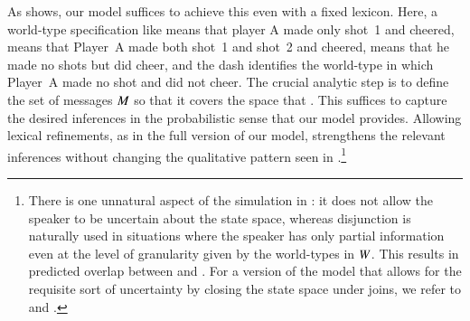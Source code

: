\documentclass[leqno,12pt]{article}
\begin{document}
As  shows, our model suffices to achieve this
even with a fixed lexicon. Here, a world-type specification like
 means that player A made only shot~1 and cheered,
 means that Player~A made both shot~1 and
shot~2 and cheered,  means that he made no shots but did
cheer, and the dash identifies the world-type in which Player~A made
no shot and did not cheer. The crucial analytic step is to define the
set of messages $M$ so that it covers the space that
\citeauthor{Sauerland01}. This suffices to capture the desired
inferences in the probabilistic sense that our model provides.
Allowing lexical refinements, as in the full version of our model,
strengthens the relevant inferences without changing the qualitative
pattern seen in .\footnote{There is one
  unnatural aspect of the simulation in : it
  does not allow the speaker to be uncertain about the state space,
  whereas disjunction is naturally used in situations where the
  speaker has only partial information even at the level of
  granularity given by the world-types in $W$. This results in
  predicted overlap between 
  and . For a version of the model that
  allows for the requisite sort of uncertainty by closing the state
  space under joins, we refer to \citealt{Bergen:Levy:Goodman:2014}
  and \citealt{Potts:Levy:2015}.}
  
\end{document}
